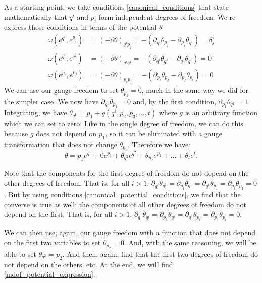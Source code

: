 \documentclass[10pt,twocolumn, nofootinbib]{revtex4-2}
\begin{document}
As a starting point, we take conditions \ref{canonical_conditions} that state mathematically that $q^i$ and $p_i$ form independent degrees of freedom. We re-express those conditions in terms of the potential $\theta$
\begin{equation}\label{canonical_potential_conditions}
\begin{aligned}
	\omega(e^{q^i}, e^{p_j}) &= (-\partial\theta)_{q^i p_j} = -(\partial_{q^i}\theta_{p_j} - \partial_{p_j}\theta_{q^i}) = \delta^i_j \\
	\omega(e^{q^i}, e^{q^j}) &= (-\partial\theta)_{q^i q^j} = -(\partial_{q^i}\theta_{q^j} - \partial_{q^j}\theta_{q^i}) = 0 \\
	\omega(e^{p_i}, e^{p_j}) &= (-\partial\theta)_{p_i p_j} = -(\partial_{p_i}\theta_{p_j} - \partial_{p_j}\theta_{p_i}) = 0
\end{aligned}
\end{equation}
We can use our gauge freedom to set $\theta_{p_1} = 0$, much in the same way we did for the simpler case. We now have $\partial_{q^1} \theta_{p_1} = 0$ and, by the first condition, $\partial_{p_1} \theta_{q^1} = 1$. Integrating, we have $\theta_{q^1} = p_1 + g(q^i, p_2, p_3, ..., t)$ where $g$ is an arbitrary function which we can set to zero. Like in the single degree of freedom, we can do this because $g$ does not depend on $p_1$, so it can be eliminated with a gauge transformation that does not change $\theta_{p_1}$. Therefore we have:
\begin{equation}
	\theta = p_1 e^{q^1} + 0 e^{p_1} + \theta_{q^2} e^{q^2} + \theta_{p_2} e^{p_2} + ... + \theta_{t} e^{t}.
\end{equation}

Note that the components for the first degree of freedom do not depend on the other degrees of freedom. That is, for all $i>1$, $\partial_{q^i} \theta_{q^1} = \partial_{p_i} \theta_{q^1} = \partial_{q^i} \theta_{p_1} = \partial_{p_i} \theta_{p_1} = 0$. But by using conditions \ref{canonical_potential_conditions}, we find that the converse is true as well: the components of all other degrees of freedom do not depend on the first. That is, for all $i>1$, $\partial_{q^1} \theta_{q^i} = \partial_{p_1} \theta_{q^i} = \partial_{q^1} \theta_{p_i} = \partial_{p_1} \theta_{p_i} = 0$.

We can then use, again, our gauge freedom with a function that does not depend on the first two variables to set $\theta_{p_2} = 0$. And, with the same reasoning, we will be able to set $\theta_{q^2} = p_2$. And then, again, find that the first two degrees of freedom do not depend on the others, etc. At the end, we will find \ref{mdof_potential_expression}.
\end{document}
